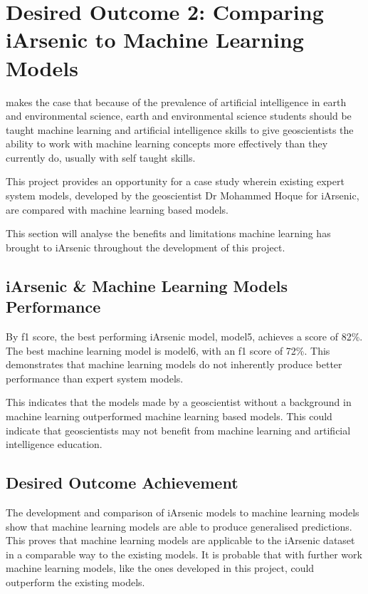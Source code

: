 \newpage

\section{Desired Outcome 2: Comparing iArsenic to Machine Learning Models}

\cite{Fleming2021} makes the case that because of the prevalence of artificial intelligence in earth and environmental science, earth and environmental science students should be taught machine learning and artificial intelligence skills to give geoscientists the ability to work with machine learning concepts more effectively than they currently do, usually with self taught skills.

This project provides an opportunity for a case study wherein existing expert system models, developed by the geoscientist Dr Mohammed Hoque for iArsenic, are compared with machine learning based models.

This section will analyse the benefits and limitations machine learning has brought to iArsenic throughout the development of this project.

\subsection{iArsenic \& Machine Learning Models Performance}

By f1 score, the best performing iArsenic model, model5, achieves a score of 82\%. The best machine learning model is model6, with an f1 score of 72\%. This demonstrates that machine learning models do not inherently produce better performance than expert system models.

This indicates that the models made by a geoscientist without a background in machine learning outperformed machine learning based models. This could indicate that geoscientists may not benefit from machine learning and artificial intelligence education.

\subsection{Desired Outcome Achievement}

The development and comparison of iArsenic models to machine learning models show that machine learning models are able to produce generalised predictions. This proves that machine learning models are applicable to the iArsenic dataset in a comparable way to the existing models. It is probable that with further work machine learning models, like the ones developed in this project, could outperform the existing models. 


